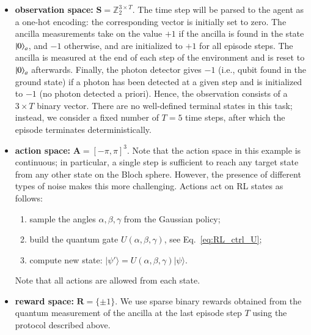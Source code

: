 \begin{itemize}
    \item \textbf{observation space:} $\mathbf{S} = \mathbb{Z}_2^{3 \times T}$. The time step will be parsed to the agent as a one-hot encoding: the corresponding vector is initially set to zero. The ancilla measurements take on the value $+1$ if the ancilla is found in the state $\ket{0}_a$, and $-1$ otherwise, and are initialized to $+1$ for all episode steps. The ancilla is measured at the end of each step of the environment and is reset 
    to $\ket{0}_a$ afterwards. Finally, the photon detector gives $-1$ (i.e., qubit found in the ground state) if a photon has been detected at a given step and is initialized to $-1$ (no photon detected a priori). Hence, the observation consists of a $3 \times T$ binary vector. There are no well-defined terminal states in this task; instead, we consider a fixed number of $T=5$ time steps, after which the episode terminates deterministically. 

    \item \textbf{action space:} $\mathbf{A} = [-\pi,\pi]^3$. Note that the action space in this example is continuous; in particular, a single step is sufficient to reach any target state from any other state on the Bloch sphere. However, the presence of different types of noise makes this more challenging. Actions act on RL states as follows:
    \begin{enumerate}
        \item sample the angles $\alpha,\beta,\gamma$ from the Gaussian policy; 
        \item build the quantum gate $U(\alpha,\beta,\gamma)$, see Eq.~\eqref{eq:RL_ctrl_U}; 
        \item compute new state: $|\psi'\rangle = U(\alpha,\beta,\gamma)|\psi\rangle$. 
    \end{enumerate}
    Note that all actions are allowed from each state. 

    \item \textbf{reward space:} $\mathbf{R}=\{\pm 1\}$. We use sparse binary rewards obtained from the quantum measurement of the ancilla at the last episode step $T$ using the protocol described above.
\end{itemize}


